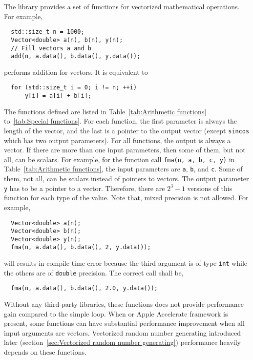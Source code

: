 The library provides a set of functions for vectorized mathematical operations.
For example,
\begin{Verbatim}
  std::size_t n = 1000;
  Vector<double> a(n), b(n), y(n);
  // Fill vectors a and b
  add(n, a.data(), b.data(), y.data());
\end{Verbatim}
performs addition for vectors. It is equivalent to
\begin{Verbatim}
  for (std::size_t i = 0; i != n; ++i)
      y[i] = a[i] + b[i];
\end{Verbatim}
The functions defined are listed in Table~\ref{tab:Arithmetic functions}
to~\ref{tab:Special functions}. For each function, the first parameter is
always the length of the vector, and the last is a pointer to the output vector
(except \verb|sincos| which has two output parameters). For all functions, the
output is always a vector. If there are more than one input parameters, then
some of them, but not all, can be scalars. For example, for the function call
\verb|fma(n, a, b, c, y)| in Table~\ref{tab:Arithmetic functions}, the input
parameters are \verb|a|, \verb|b|, and \verb|c|. Some of them, not all, can be
scalars instead of pointers to vectors. The output parameter \verb|y| has to be
a pointer to a vector. Therefore, there are $2^3 - 1$ versions of this function
for each type of the value. Note that, mixed precision is not allowed. For
example,
\begin{Verbatim}
  Vector<double> a(n);
  Vector<double> b(n);
  Vector<double> y(n);
  fma(n, a.data(), b.data(), 2, y.data());
\end{Verbatim}
will results in compile-time error because the third argument is of type
\verb|int| while the others are of \verb|double| precision. The correct call
shall be,
\begin{Verbatim}
  fma(n, a.data(), b.data(), 2.0, y.data());
\end{Verbatim}

Without any third-party libraries, these functions does not provide performance
gain compared to the simple loop. When \mkl or Apple Accelerate framework is
present, some functions can have substantial performance improvement when all
input arguments are vectors. Vectorized random number generating
introduced later (section~\ref{sec:Vectorized random number generating})
performance heavily depends on these functions.

